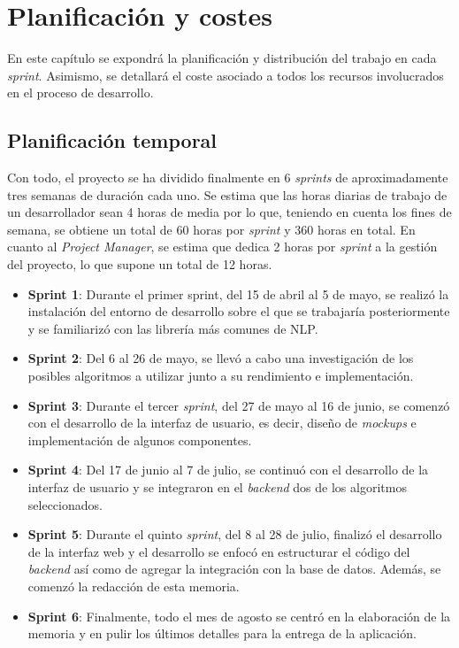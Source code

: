 \chapter{Planificación y costes}
\label{chap:planificacion}

En este capítulo se expondrá la planificación y distribución del trabajo en cada \textit{sprint}. Asimismo,
se detallará el coste asociado a todos los recursos involucrados en el proceso de desarrollo.

\section{Planificación temporal}

Con todo, el proyecto se ha dividido finalmente en 6 \textit{sprints} de aproximadamente tres semanas de duración cada uno.
Se estima que las horas diarias de trabajo de un desarrollador sean 4 horas de media por lo que, teniendo en cuenta los fines de semana, se obtiene
un total de 60 horas por \textit{sprint} y 360 horas en total. En cuanto al \textit{Project Manager}, se estima que dedica 2 horas por \textit{sprint}
a la gestión del proyecto, lo que supone un total de 12 horas.

\begin{itemize}
	\item \textbf{Sprint 1}: Durante el primer sprint, del 15 de abril al 5 de mayo, se realizó la instalación del entorno
	de desarrollo sobre el que se trabajaría posteriormente y se familiarizó con las librería más comunes de NLP.
	\item \textbf{Sprint 2}: Del 6 al 26 de mayo, se llevó a cabo una investigación de los posibles algoritmos a utilizar
	junto a su rendimiento e implementación.
	\item \textbf{Sprint 3}: Durante el tercer \textit{sprint}, del 27 de mayo al 16 de junio, se comenzó con el desarrollo
	de la interfaz de usuario, es decir, diseño de \textit{mockups} e implementación de algunos componentes.
	\item \textbf{Sprint 4}: Del 17 de junio al 7 de julio, se continuó con el desarrollo de la interfaz de usuario y se integraron
	en el \textit{backend} dos de los algoritmos seleccionados.
	\item \textbf{Sprint 5}: Durante el quinto \textit{sprint}, del 8 al 28 de julio, finalizó el desarrollo de la interfaz web
	y el desarrollo se enfocó en estructurar el código del \textit{backend} así como de agregar la integración con la base de datos. 
	Además, se comenzó la redacción de esta memoria.
	\item \textbf{Sprint 6}: Finalmente, todo el mes de agosto se centró en la elaboración de la memoria y en pulir los últimos detalles
	para la entrega de la aplicación.
\end{itemize}

